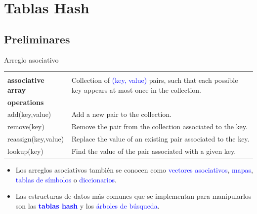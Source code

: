 \documentclass[handout]{beamer} %
\newcommand{\blue}[1]{\textcolor{blue}{#1}}
\begin{document}

\section{Tablas Hash}

\subsection{Preliminares}

\begin{frame}{Arreglo asociativo}
    \scriptsize{
    \begin{tabular}{lp{60ex}}\hline\\[-1ex]
      {\bf\normalsize associative array} & Collection of \blue{(key, value)} pairs, such that each possible key appears at most once in the collection.\\
      {\bf\small operations}  & \\
      add(key,value)             & Add a new pair to the collection.\\
      remove(key) & Remove the pair from the collection associated to the key.\\
      reassign(key,value) & Replace the value of an existing pair associated to the key.\\
      lookup(key) & Find the value of the pair associated with a given key.\\[1.5ex]\hline
    \end{tabular}

    \begin{itemize}
        \item<2-> Los arreglos asociativos también se conocen como \blue{vectores asociativos}, \blue{mapas}, \blue{tablas de símbolos} o \blue{diccionarios}.
        \item<3-> Las estructuras de datos más comunes que se implementan para manipularlos son las \blue{\bf tablas hash} y los \blue{árboles de búsqueda}.
    \end{itemize}}
\end{frame}
\end{document}
